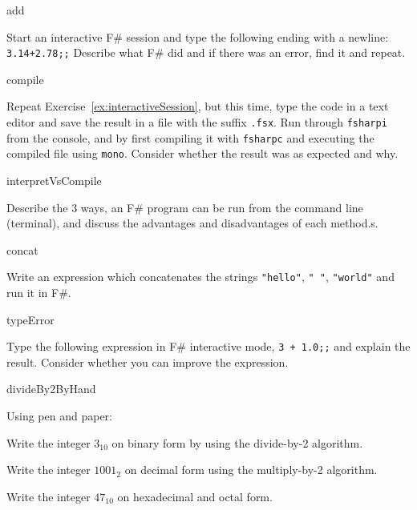 
\begin{defproblem}{add}
  \begin{onlyproblem}%
    \label{ex:interactiveSession}
    Start an interactive F\# session and type the following ending with a newline: \lstinline{3.14+2.78;;} Describe what F\# did and if there was an error, find it and repeat.
  \end{onlyproblem}
\end{defproblem}

\begin{defproblem}{compile}
  \begin{onlyproblem}%
    Repeat Exercise~\ref{ex:interactiveSession}, but this time, type the code in a text editor and save the result in a file with the suffix \texttt{.fsx}. Run through \lstinline[language=console]{fsharpi} from the console, and by first compiling it with \lstinline[language=console]{fsharpc} and executing the compiled file using \lstinline[language=console]{mono}. Consider whether the result was as expected and why.
  \end{onlyproblem}
\end{defproblem}

\begin{defproblem}{interpretVsCompile}
  \begin{onlyproblem}%
    Describe the 3 ways, an F\# program can be run from the command line (terminal), and discuss the advantages and disadvantages of each method.s.
  \end{onlyproblem}
\end{defproblem}

\begin{defproblem}{concat}
  \begin{onlyproblem}%
    Write an expression which concatenates the strings \lstinline{"hello"}, \lstinline{" "}, \lstinline{"world"} and run it in F\#.
  \end{onlyproblem}
\end{defproblem}

\begin{defproblem}{typeError}
  \begin{onlyproblem}%
    Type the following expression in F\# interactive mode, \lstinline{3 + 1.0;;} and explain the result. Consider whether you can improve the expression.
  \end{onlyproblem}
\end{defproblem}

\begin{defproblem}{divideBy2ByHand}
  \begin{onlyproblem}%
    Using pen and paper:
    \begin{textenum}
    \item Write the integer $3_{10}$ on binary form by using the divide-by-2 algorithm.
    \item Write the integer $1001_2$ on decimal form using the multiply-by-2 algorithm.
    \item Write the integer $47_{10}$ on hexadecimal and octal form.
    \end{textenum}
  \end{onlyproblem}
\end{defproblem}

